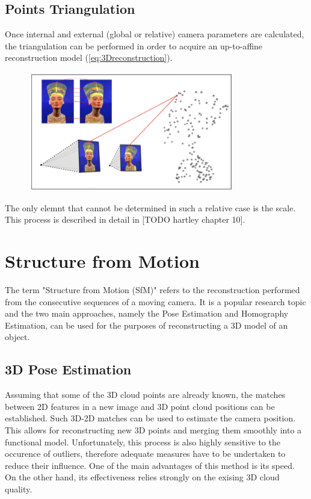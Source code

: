 \subsection{Points Triangulation}
Once internal and external (global or relative) camera parameters are calculated, the triangulation can be performed in order to acquire an up-to-affine reconstruction model (\ref{eq:3Dreconstruction}).
\begin{figure}[p]
    \centering
    \includegraphics[width=0.8\textwidth]{3Dreconstruction}
    \caption{}
    \label{fig:3Dreconstruction}
\end{figure}
The only elemnt that cannot be determined in such a relative case is the scale. This process is described in detail in [TODO hartley chapter 10].
\section{Structure from Motion}
The term "Structure from Motion (SfM)" refers to the reconstruction performed from the consecutive sequences of a moving camera. It is a popular research topic and the two main approaches, namely the Pose Estimation and Homography Estimation, can be used for the purposes of reconstructing a 3D model of an object.
\subsection{3D Pose Estimation}
Assuming that some of the 3D cloud points are already known, the matches between 2D features in a new image and 3D point cloud positions can be established. Such 3D-2D matches can be used to estimate the camera position. This allows for reconstructing new 3D points and merging them smoothly into a functional model. Unfortunately,  this process is also highly sensitive to the occurence of outliers, therefore adequate measures have to be undertaken to reduce their influence. One of the main advantages of this method is its speed. On the other hand, its effectiveness relies strongly on the exising 3D cloud quality. 
